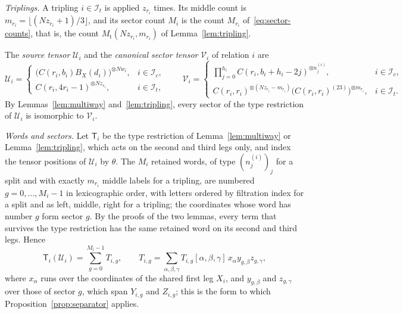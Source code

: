 \emph{Triplings.} A tripling \(i\in\mathcal I_t\) is applied
\(z_{r_i}\) times. Its middle count is
\(m_{r_i}=\lfloor(Nz_{r_i}+1)/3\rfloor\), and its sector count \(M_i\) is
the count \(M_{r_i}\) of~\eqref{eq:sector-counts}, that is, the count
\(M_{\mathrm t}(Nz_{r_i},m_{r_i})\) of Lemma~\ref{lem:tripling}.

The \emph{source tensor} \(\mathcal U_i\) and the \emph{canonical sector
tensor} \(\mathcal V_i\) of relation \(i\) are
\[
 \mathcal U_i=
 \begin{cases}
 \bigl(C(r_i,b_i)B_X(d_i)\bigr)^{\otimes Nw_i},&i\in\mathcal I_c,\\[2pt]
 C(r_i,4r_i-1)^{\otimes Nz_{r_i}},&i\in\mathcal I_t,
 \end{cases}
 \qquad
 \mathcal V_i=
 \begin{cases}
 \prod_{j=0}^{h_i}
 C(r_i,b_i+h_i-2j)^{\otimes n^{(i)}_j},&i\in\mathcal I_c,\\[2pt]
 C(r_i,r_i)^{\otimes(Nz_{r_i}-m_{r_i})}
 \bigl(C(r_i,r_i)^{(23)}\bigr)^{\otimes m_{r_i}},&i\in\mathcal I_t.
 \end{cases}
\]
By Lemmas~\ref{lem:multiway} and~\ref{lem:tripling}, every sector of the
type restriction of \(\mathcal U_i\) is isomorphic to \(\mathcal V_i\).

\emph{Words and sectors.} Let \(\mathsf T_i\) be the type restriction of
Lemma~\ref{lem:multiway} or Lemma~\ref{lem:tripling}, which acts on the
second and third legs only, and index the tensor positions of
\(\mathcal U_i\) by \(\theta\). The \(M_i\) retained words, of type
\((n^{(i)}_j)_j\) for a split and with exactly \(m_{r_i}\) middle labels
for a tripling, are numbered \(g=0,\ldots,M_i-1\) in lexicographic order,
with letters ordered by filtration index for a split and as left, middle,
right for a tripling; the coordinates whose word has number \(g\) form
sector \(g\). By the proofs of the two lemmas, every term that survives the
type restriction has the same retained word on its second and third legs.
Hence
\begin{equation}\label{eq:type-restricted-relation}
 \mathsf T_i(\mathcal U_i)=\sum_{g=0}^{M_i-1}T_{i,g},\qquad
 T_{i,g}=\sum_{\alpha,\beta,\gamma}T_{i,g}[\alpha,\beta,\gamma]\,
 x_\alpha y_{g,\beta}z_{g,\gamma},
\end{equation}
where \(x_\alpha\) runs over the coordinates of the shared first leg
\(X_i\), and \(y_{g,\beta}\) and \(z_{g,\gamma}\) over those of sector
\(g\), which span \(Y_{i,g}\) and \(Z_{i,g}\); this is the form to which
Proposition~\ref{prop:separator} applies.

